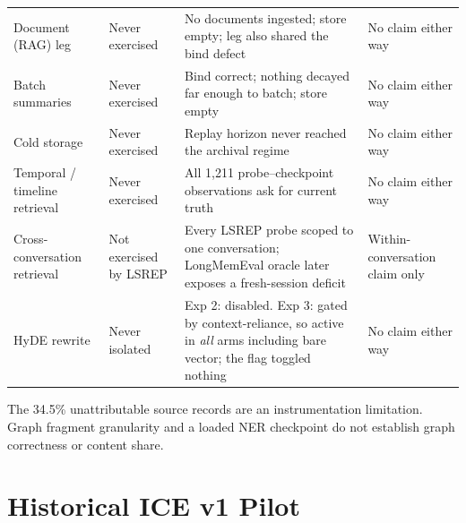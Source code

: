 \documentclass[11pt,a4paper]{article}
\begin{document}
\begin{table}[htbp]
\begin{tabular}{@{}L{2.6cm}L{2.0cm}L{5.1cm}L{2.9cm}@{}}
\midrule
Document (RAG) leg & Never exercised & No documents ingested; store empty; leg also shared the bind defect & No claim either way \\
Batch summaries & Never exercised & Bind correct; nothing decayed far enough to batch; store empty & No claim either way \\
Cold storage & Never exercised & Replay horizon never reached the archival regime & No claim either way \\
Temporal / timeline retrieval & Never exercised & All 1{,}211 probe--checkpoint observations ask for current truth & No claim either way \\
Cross-conversation retrieval & Not exercised by LSREP & Every LSREP probe scoped to one conversation; LongMemEval oracle later exposes a fresh-session deficit & Within-conversation claim only \\
HyDE rewrite & Never isolated & Exp 2: disabled. Exp 3: gated by context-reliance, so active in \emph{all} arms including bare vector; the flag toggled nothing & No claim either way \\
\bottomrule
\end{tabular}
\end{table}

The 34.5\% unattributable source records are an instrumentation limitation. Graph fragment granularity and a loaded NER checkpoint do not establish graph correctness or content share.

\FloatBarrier
\section{Historical ICE v1 Pilot}
\label{app:exp1}
\end{document}
